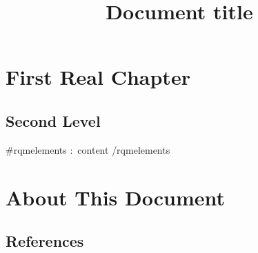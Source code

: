 \documentclass[a4paper,11pt]{article}
\title{Document title}
\begin{document}
	\setcounter{tocdepth}{3}
	\renewcommand\contentsname{Contents}
	\tableofcontents
	
	\bigskip
	
	\setcounter{tocdepth}{1}
	\renewcommand\contentsname{List of Figures}
	\begingroup
	\let\clearpage\relax
	\listoffigures
	\endgroup
	
	\bigskip

	\setcounter{tocdepth}{1}
	\renewcommand\contentsname{List of Tables}
	\begingroup
	\let\clearpage\relax
	\listoftables
	\endgroup

	\section{First Real Chapter}
	
	\subsection{Second Level}
	
	{{#rqmelements}}
    \textbf{$\colon$} {{content}}\newline
	{{/rqmelements}}
	
	\section{About This Document}
	
	\subsection{References}
	
\end{document}
